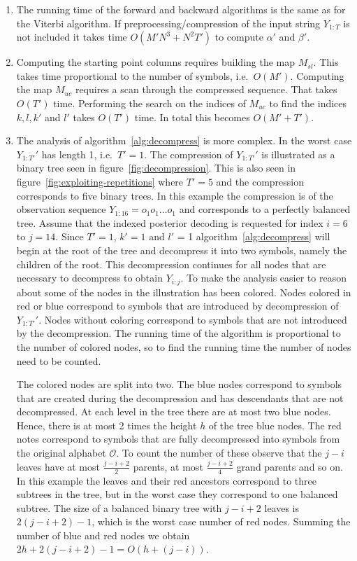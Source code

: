 \begin{enumerate}
\item The running time of the forward and backward algorithms is the same as
  for the Viterbi algorithm. If preprocessing/compression of the input string
  $Y_{1:T}$ is not included it takes time $O(M' N^3 + N^2 T')$ to compute
  $\alpha'$ and $\beta'$.

\item Computing the starting point columns requires building the map $M_{sl}$.
  This takes time proportional to the number of symbols, i.e.\ $O(M')$.
  Computing the map $M_{uc}$ requires a scan through the compressed
  sequence. That takes $O(T')$ time.
  Performing the search on the indices of $M_{uc}$ to find the indices
  $k, l, k'$ and $l'$ takes $O(T')$ time. In total this becomes
  $O(M' + T')$.

\item The analysis of algorithm~\ref{alg:decompress} is more complex. In the
  worst case $Y_{1:T'}'$ has length 1, i.e.\ $T' = 1$. The compression of
  $Y_{1:T'}'$ is illustrated as a binary tree seen in
  figure~\ref{fig:decompression}. This is also seen in
  figure~\ref{fig:exploiting-repetitions} where $T' = 5$ and the compression
  corresponds to five binary trees. In this example the compression is
  of the observation sequence $Y_{1:16} = o_1o_1\dots{}o_1$ and corresponds to a
  perfectly balanced tree. Assume that the indexed posterior decoding is
  requested for index $i = 6$ to $j = 14$. Since $T' = 1$, $k' = 1$ and $l'$ =
  1 algorithm~\ref{alg:decompress} will begin at the root of the tree and
  decompress it into two symbols, namely the children of the root. This
  decompression continues for all nodes that are necessary to decompress to
  obtain $Y_{i:j}$. To make the analysis easier to reason about some of the
  nodes in the illustration has been colored. Nodes colored in red or blue correspond to
  symbols that are introduced by decompression of $Y_{1:T'}'$. Nodes without
  coloring correspond to symbols that are not introduced by the decompression. The running time of the
  algorithm is proportional to the number of colored nodes, so to find the
  running time the number of nodes need to be counted.

  The colored nodes are split into two. The blue nodes correspond to symbols
  that are created during the decompression and has descendants that are not
  decompressed. At each level in the tree there are at most two blue nodes.
  Hence, there is at most 2 times the height $h$ of the tree blue nodes. The
  red notes correspond to symbols that are fully decompressed into symbols from
  the original alphabet $\mathcal{O}$. To count the number of these observe
  that the $j - i$ leaves have at most $\frac{j - i + 2}{2}$ parents, at most
  $\frac{j - i + 2}{4}$ grand parents and so on. In this example the leaves and
  their red ancestors correspond to three subtrees in the tree, but in the
  worst case they correspond to one balanced subtree. The size of a balanced
  binary tree with $j - i + 2$ leaves is $2(j - i + 2) - 1$, which is the worst
  case number of red nodes. Summing the number of blue and red nodes we obtain
  $2h + 2(j - i + 2) - 1 = O(h + (j - i))$.


\end{enumerate}
